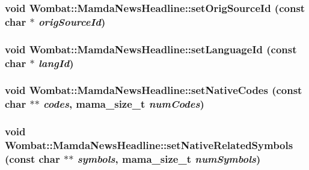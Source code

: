 \hypertarget{classWombat_1_1MamdaNewsHeadline_e1d4392103ea5bcc6defab7ddf87bfd0}{
\subsubsection[setOrigSourceId]{\setlength{\rightskip}{0pt plus 5cm}void Wombat::Mamda\-News\-Headline::set\-Orig\-Source\-Id (const char $\ast$ {\em orig\-Source\-Id})}}
\label{classWombat_1_1MamdaNewsHeadline_e1d4392103ea5bcc6defab7ddf87bfd0}


\hypertarget{classWombat_1_1MamdaNewsHeadline_259142c05c41c64535f54477e0e67bfe}{
\subsubsection[setLanguageId]{\setlength{\rightskip}{0pt plus 5cm}void Wombat::Mamda\-News\-Headline::set\-Language\-Id (const char $\ast$ {\em lang\-Id})}}
\label{classWombat_1_1MamdaNewsHeadline_259142c05c41c64535f54477e0e67bfe}


\hypertarget{classWombat_1_1MamdaNewsHeadline_6a36c1b5a54d35cb8238437511644c07}{
\subsubsection[setNativeCodes]{\setlength{\rightskip}{0pt plus 5cm}void Wombat::Mamda\-News\-Headline::set\-Native\-Codes (const char $\ast$$\ast$ {\em codes}, mama\_\-size\_\-t {\em num\-Codes})}}
\label{classWombat_1_1MamdaNewsHeadline_6a36c1b5a54d35cb8238437511644c07}


\hypertarget{classWombat_1_1MamdaNewsHeadline_c3bd51323c393438eb4413fa9789737c}{
\subsubsection[setNativeRelatedSymbols]{\setlength{\rightskip}{0pt plus 5cm}void Wombat::Mamda\-News\-Headline::set\-Native\-Related\-Symbols (const char $\ast$$\ast$ {\em symbols}, mama\_\-size\_\-t {\em num\-Symbols})}}
\label{classWombat_1_1MamdaNewsHeadline_c3bd51323c393438eb4413fa9789737c}


